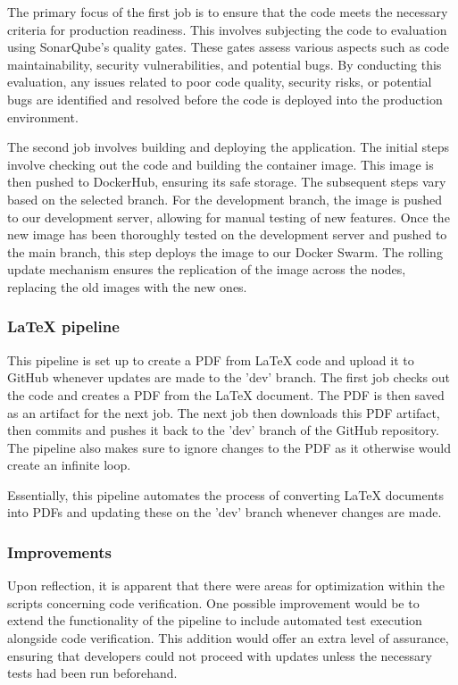 The primary focus of the first job is to ensure that the code meets the necessary criteria for production readiness. This involves subjecting the code to evaluation using SonarQube's quality gates. These gates assess various aspects such as code maintainability, security vulnerabilities, and potential bugs. By conducting this evaluation, any issues related to poor code quality, security risks, or potential bugs are identified and resolved before the code is deployed into the production environment.

The second job involves building and deploying the application. The initial steps involve checking out the code and building the container image. This image is then pushed to DockerHub, ensuring its safe storage. The subsequent steps vary based on the selected branch. For the development branch, the image is pushed to our development server, allowing for manual testing of new features. Once the new image has been thoroughly tested on the development server and pushed to the main branch, this step deploys the image to our Docker Swarm. The rolling update mechanism ensures the replication of the image across the nodes, replacing the old images with the new ones.


\subsubsection{LaTeX pipeline}
This pipeline is set up to create a PDF from LaTeX code and upload it to GitHub whenever updates are made to the 'dev' branch. The first job checks out the code and creates a PDF from the LaTeX document. The PDF is then saved as an artifact for the next job. The next job  then downloads this PDF artifact, then commits and pushes it back to the 'dev' branch of the GitHub repository. The pipeline also makes sure to ignore changes to the PDF as it otherwise would create an infinite loop. 

Essentially, this pipeline automates the process of converting LaTeX documents into PDFs and updating these on the 'dev' branch whenever changes are made. 

\subsubsection{Improvements}
Upon reflection, it is apparent that there were areas for optimization within the scripts concerning code verification. One possible improvement would be to extend the functionality of the pipeline to include automated test execution alongside code verification. This addition would offer an extra level of assurance, ensuring that developers could not proceed with updates unless the necessary tests had been run beforehand.

